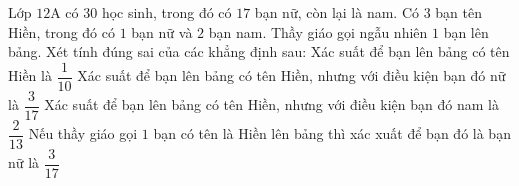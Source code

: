\begin{ex}%
	Lớp $12$A có $30$ học sinh, trong đó có $17$ bạn nữ, còn lại là nam. Có $3$ bạn tên Hiền, trong đó có $1$ bạn nữ và $2$ bạn nam. Thầy giáo gọi ngẫu nhiên $1$ bạn lên bảng. Xét tính đúng sai của các khẳng định sau:
	\choiceTF
	{\True Xác suất để bạn lên bảng có tên Hiền là $\dfrac{1}{10}$}
	{Xác suất để bạn lên bảng có tên Hiền, nhưng với điều kiện bạn đó nữ là $\dfrac{3}{17}$}
	{\True Xác suất để bạn lên bảng có tên Hiền, nhưng với điều kiện bạn đó nam là $\dfrac{2}{13}$}
	{Nếu thầy giáo gọi $1$ bạn có tên là Hiền lên bảng thì xác xuất để bạn đó là bạn nữ là $\dfrac{3}{17}$}
\end{ex}

